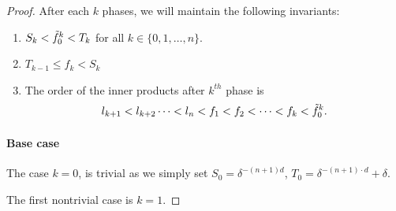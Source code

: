 \begin{proof}
    After each $k$ phases, we will maintain the following invariants:
    \begin{enumerate}
    \item  $S_k < \tilde{f}^k_0 < T_k$ for all $k \in \{ 0, 1, \dots, n\}$. 
    \item  $T_{k-1} \leq  f_k < S_k $
    \item  The order of the inner products after $k^{th}$ phase is 
     \[l_{k+1} < l_{k+2} \dots < l_n < f_1 < f_2< \dots <  f_{k} < \tilde{f}_0^k .\] 
    \end{enumerate}
    
    
    \paragraph{Base case}    
    The case $k=0$, is trivial as we simply set  $S_0 = \delta^{-(n+1)d}$, $T_0 = \delta^{-(n+1)\cdot d}+\delta$. 
    
    The first nontrivial case is $k=1$. 


\end{proof}

